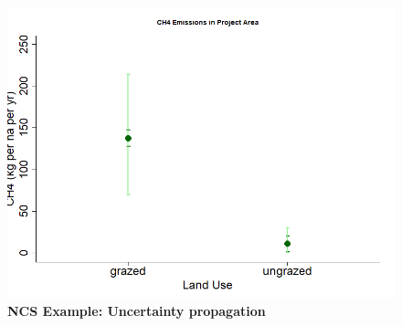 \documentclass{article}
\begin{document}
  
 \begin{figure}[h]
\centering
 \includegraphics{../figs/ncs/ncsprojimpactch4.png}
 \caption{\textbf{NCS Example: Uncertainty propagation}} 
 \label{fig:ncs}
 \end{figure}
 
 

\end{document}
